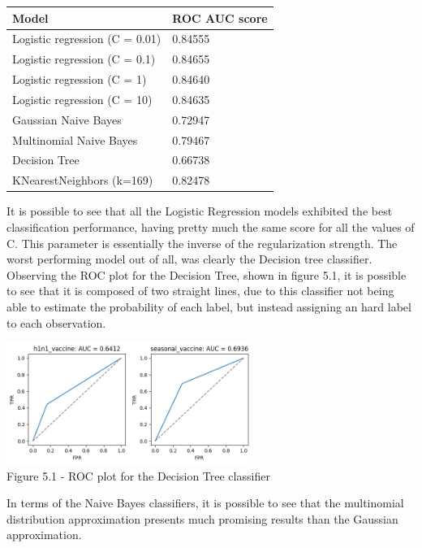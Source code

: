 \documentclass{IEEEtran}
\begin{document}
\begin{center}
    \begin{tabular}{|l|l|}
        \hline
    \textbf{Model} & \textbf{ROC AUC score} \\ 
    \hline \hline
    Logistic regression (C = 0.01) & 0.84555 \\ \hline
    Logistic regression (C = 0.1) & 0.84655 \\ \hline
    Logistic regression (C = 1) & 0.84640 \\ \hline
    Logistic regression (C = 10) & 0.84635 \\ \hline
    Gaussian Naive Bayes & 0.72947 \\ \hline
    Multinomial Naive Bayes & 0.79467 \\ \hline
    Decision Tree & 0.66738 \\ \hline
    KNearestNeighbors (k=169) & 0.82478 \\ \hline
    \end{tabular}
\end{center}

It is possible to see that all the Logistic Regression models exhibited the best classification performance, having pretty much the same score for all the values of C. This parameter is essentially the inverse of the regularization strength. 
The worst performing model out of all, was clearly the Decision tree classifier. Observing the ROC plot for the Decision Tree, shown in figure 5.1, it is possible to see that it is composed of two straight lines, due to this classifier not being able to estimate the probability of each label, but instead assigning an hard label to each observation.

\begin{center}
    \includegraphics[width=8cm]{figures/decisionTreeROC.png}\\
    Figure 5.1 - ROC plot for the Decision Tree classifier
\end{center}

In terms of the Naive Bayes classifiers, it is possible to see that the multinomial distribution approximation presents much promising results than the Gaussian approximation.
\end{document}
